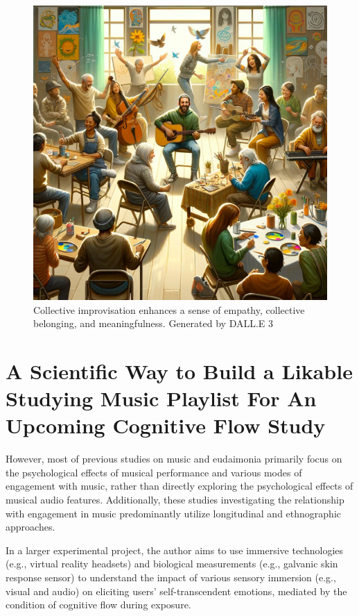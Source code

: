 \documentclass[
]{book}
\begin{document}
\begin{figure}
\centering
\includegraphics{2.png}
\caption{Collective improvisation enhances a sense of empathy, collective belonging, and meaningfulness. Generated by DALL.E 3}
\end{figure}

\hypertarget{a-scientific-way-to-build-a-likable-studying-music-playlist-for-an-upcoming-cognitive-flow-study}{%
\section{A Scientific Way to Build a Likable Studying Music Playlist For An Upcoming Cognitive Flow Study}\label{a-scientific-way-to-build-a-likable-studying-music-playlist-for-an-upcoming-cognitive-flow-study}}

However, most of previous studies on music and eudaimonia primarily focus on the psychological effects of musical performance and various modes of engagement with music, rather than directly exploring the psychological effects of musical audio features. Additionally, these studies investigating the relationship with engagement in music predominantly utilize longitudinal and ethnographic approaches.

In a larger experimental project, the author aims to use immersive technologies (e.g., virtual reality headsets) and biological measurements (e.g., galvanic skin response sensor) to understand the impact of various sensory immersion (e.g., visual and audio) on eliciting users' self-transcendent emotions, mediated by the condition of cognitive flow during exposure.
\end{document}

